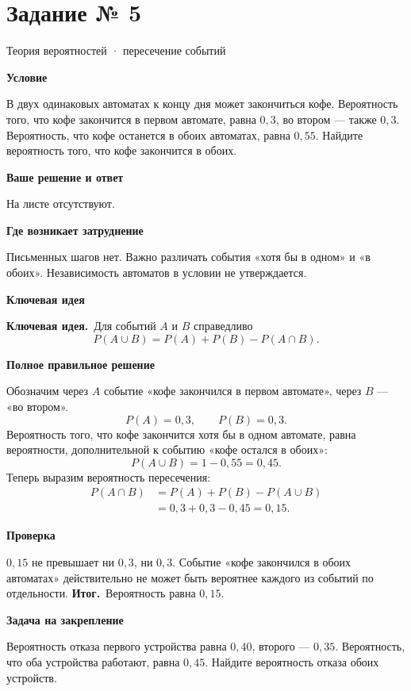 \documentclass[a4paper,12pt]{article}
\newcommand{\keyidea}{\textcolor{accent}{\textbf{Ключевая идея.}}\ }
\newcommand{\result}{\textcolor{accent}{\textbf{Итог.}}\ }
\newcommand{\taskstart}[2]{\clearpage\phantomsection\label{task:#1}\section*{Задание № #1}\textcolor{accent}{#2}\par\vspace{2mm}}
\newcommand{\field}[1]{\par\smallskip\textbf{#1}\par\vspace{-3mm}}
\begin{document}
\taskstart{5}{Теория вероятностей · пересечение событий}
\field{Условие}
В двух одинаковых автоматах к концу дня может закончиться кофе. Вероятность того, что кофе закончится в первом автомате, равна $0{,}3$, во втором --- также $0{,}3$. Вероятность, что кофе останется в обоих автоматах, равна $0{,}55$. Найдите вероятность того, что кофе закончится в обоих.
\field{Ваше решение и ответ}
На листе отсутствуют.
\field{Где возникает затруднение}
Письменных шагов нет. Важно различать события «хотя бы в одном» и «в обоих». Независимость автоматов в условии не утверждается.
\field{Ключевая идея}
\keyidea Для событий $A$ и $B$ справедливо
\[P(A\cup B)=P(A)+P(B)-P(A\cap B).\]
\field{Полное правильное решение}
Обозначим через $A$ событие «кофе закончился в первом автомате», через $B$ --- «во втором».
\[P(A)=0{,}3,\qquad P(B)=0{,}3.\]
Вероятность того, что кофе закончится хотя бы в одном автомате, равна вероятности, дополнительной к событию «кофе остался в обоих»:
\[P(A\cup B)=1-0{,}55=0{,}45.\]
Теперь выразим вероятность пересечения:
\begin{align*}
P(A\cap B)&=P(A)+P(B)-P(A\cup B)\\
&=0{,}3+0{,}3-0{,}45=0{,}15.
\end{align*}
\field{Проверка}
$0{,}15$ не превышает ни $0{,}3$, ни $0{,}3$. Событие «кофе закончился в обоих автоматах» действительно не может быть вероятнее каждого из событий по отдельности.
\result Вероятность равна $0{,}15$.
\field{Задача на закрепление}
Вероятность отказа первого устройства равна $0{,}40$, второго --- $0{,}35$. Вероятность, что оба устройства работают, равна $0{,}45$. Найдите вероятность отказа обоих устройств.
\end{document}
